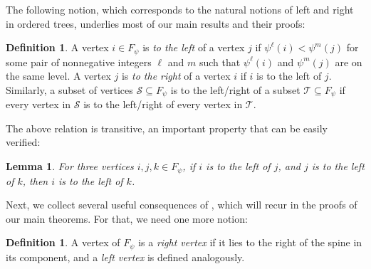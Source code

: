 \documentclass[a4paper]{amsart}
\newtheorem{lemma}[theorem]{Lemma}
\theoremstyle{definition}
\newtheorem{definition}[theorem]{Definition}
\theoremstyle{remark}
\numberwithin{equation}{theorem}
\newcommand{\Dfn}[1]{\emph{\color{blue}#1}} %
\newcommand{\psiforest}{F_\psi}
\begin{document}
The following notion, which corresponds to the natural notions of left and right in ordered trees, underlies most of our main results and their proofs:
\begin{definition}\label{to.the.left}
  A vertex $i \in \psiforest $ is \Dfn{to the left} of a vertex $j$
  if $\psi^\ell(i) < \psi^m(j)$ for some pair of nonnegative integers
  $\ell$ and $m$ such that $\psi^\ell(i)$ and $\psi^m(j)$ are on the
  same level.  A vertex $j$ is \Dfn{to the right} of a vertex $i$ if
  $i$ is to the left of $j$. Similarly, a subset of vertices $ \mathcal S \subseteq \psiforest $ is to the left/right of a subset $ \mathcal T \subseteq \psiforest $ if every vertex in $ \mathcal S $ is to the left/right of every vertex in $ \mathcal T $.
\end{definition}

The above relation is transitive, an important property that can be easily verified:

\begin{lemma}
    For three vertices $i,j,k \in \psiforest $, if $i$ is to the left of $j$, and $j$ is to the left of $k$, then $i$ is to the left of $k$.
\end{lemma}

Next, we collect several useful consequences of , which will recur in the proofs of our main theorems. For that, we need one more notion:

\begin{definition}\label{defn:left.right}
  A vertex of $ \psiforest $ is a \Dfn{right vertex} if it lies to the right of the spine
  in its component, and a \Dfn{left vertex} is defined analogously.
\end{definition}
\end{document}
